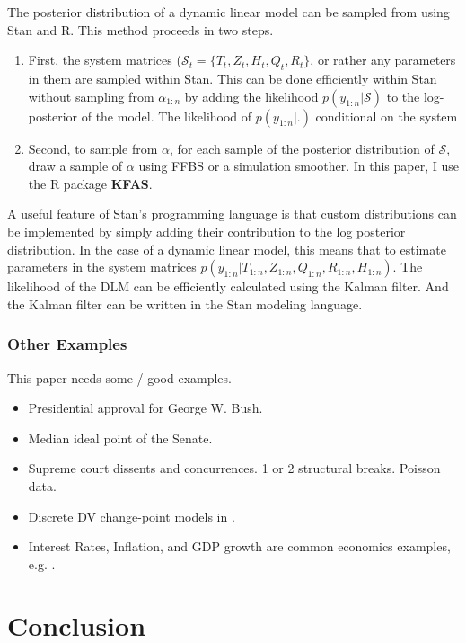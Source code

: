 \documentclass{article}
\begin{document}
The posterior distribution of a dynamic linear model can be sampled from using Stan and R.
This method proceeds in two steps.
\begin{enumerate}
\item First, the system matrices ($\mathcal{S}_{t} = \{T_{t}, Z_{t}, H_{t}, Q_{t}, R_{t}\}$, or rather any parameters in them are sampled within Stan. This can be done efficiently within Stan without sampling from $\alpha_{1:n}$ by adding the likelihood $p(y_{1:n} | \mathcal{S})$ to the log-posterior of the model.
The likelihood of $p(y_{1:n} | .)$ conditional on the system 
\item Second, to sample from $\alpha$, for each sample of the posterior distribution of $\mathcal{S}$, draw a sample of $\alpha$ using FFBS or a simulation smoother. In this paper, I use the R package \textbf{KFAS}.
\end{enumerate}

A useful feature of Stan's programming language is that custom distributions can be implemented by simply adding their contribution to the log posterior distribution.
In the case of a dynamic linear model, this means that to estimate parameters in the system matrices  $p(y_{1:n} | T_{1:n}, Z_{1:n}, Q_{1:n}, R_{1:n}, H_{1:n})$.
The likelihood of the DLM can be efficiently calculated using the Kalman filter. 
And the Kalman filter can be written in the Stan modeling language.

\subsubsection{Other Examples}

This paper needs some / good examples.

\begin{itemize}
\item Presidential approval for George W. Bush. \parencites{RatkovicEng2010}
\item Median ideal point of the Senate. \parencites{RatkovicEng2010}
\item Supreme court dissents and concurrences. 1 or 2 structural breaks. Poisson data. \parencite{CalderiaZorn1998}
\item Discrete DV change-point models in \parencite{spirling2007bayesian}.
\item Interest Rates, Inflation, and GDP growth are common economics examples, e.g. \textcite{GiordaniKohn2008}.
\end{itemize}

\section{Conclusion}
\label{sec:conclusion}
\end{document}
